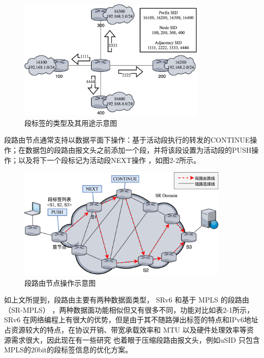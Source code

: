 \begin{figure}[htbp]
\setlength{\abovecaptionskip}{15pt plus 3pt minus 2pt}
\centerline{\includegraphics[width=0.8\textwidth]{./figures/ch2-kinds-of-SID.png}}
\caption{段标签的类型及其用途示意图}
\label{fig-ch2-kinds-of-SID}
\end{figure}

段路由节点通常支持以数据平面下操作：基于活动段执行的转发的CONTINUE操作；在数据包的段路由报文头之前添加一个段，并将该段设置为活动段的PUSH操作；以及将下一个段标记为活动段NEXT操作 \cite{SRARK} ，如图2-2所示。

\begin{figure}[htbp]
\setlength{\abovecaptionskip}{15pt plus 3pt minus 2pt}
\centerline{\includegraphics[width=0.9\textwidth]{./figures/ch2-SR-actions.png}}
\caption{段路由节点操作示意图}
\label{fig-ch2-SR-actions}
\end{figure}

如上文所提到，段路由主要有两种数据面类型， \gls*{SRv6} 和基于 \gls*{MPLS} 的段路由（SR-MPLS）\cite{SRMPLS}  ，两种数据面功能相似但又有很多不同，功能对比如表2-1所示， \gls*{SRv6} 在网络编程上有很大的优势，但是由于其不随路弹出标签的特点和IPv6地址占资源较大的特点，在协议开销、带宽承载效率和 \gls*{MTU} 以及硬件处理效率等资源需求很大，因此现在有一些研究 \cite{GSID, MICROSID, USID} 也着眼于压缩段路由报文头，例如uSID \cite{USID} 只包含MPLS的20bit的段标签信息的优化方案。


